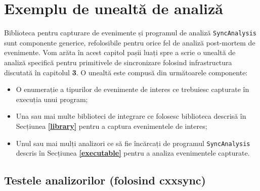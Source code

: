 \section{Exemplu de unealtă de analiză}

Biblioteca pentru capturare de evenimente și programul de analiză
\lstinline{SyncAnalysis} sunt componente generice, refolosibile
pentru orice fel de analiză post-mortem de evenimente. Vom arăta în
acest capitol pașii luați spre a scrie o unealtă de analiză specifică
pentru primitivele de sincronizare folosind infrastructura discutată în
capitolul \textbf{3}. O unealtă este compusă din următoarele componente:
\begin{itemize}
    \item O enumerație a tipurilor de evenimente de interes ce
    trebuiesc capturate în execuția unui program;
    \item Una sau mai multe biblioteci de integrare ce folosesc
    biblioteca descrisă în Secțiunea \textbf{\ref{library}} pentru a
    captura evenimentele de interes;
    \item Unul sau mai mulți analizori ce să fie încărcați de programul
    \lstinline{SyncAnalysis} descris în Secțiunea
    \textbf{\ref{executable}} pentru a analiza evenimentele capturate.
\end{itemize}







\subsection{Testele analizorilor (folosind cxxsync)}
\label{analyzer-tests}
